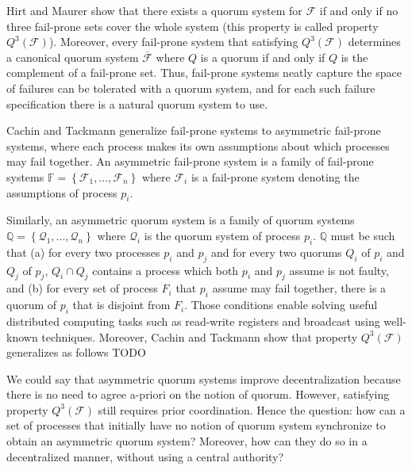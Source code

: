 \documentclass[11pt]{article}
\begin{document}
Hirt and Maurer show that there exists a quorum system for $\mathcal{F}$ if and only if no three fail-prone sets cover the whole system (this property is called property $Q^3(\mathcal{F})$). Moreover, every fail-prone system that satisfying $Q^3(\mathcal{F})$ determines a canonical quorum system $\overline{\mathcal{F}}$ where $Q$ is a quorum if and only if $Q$ is the complement of a fail-prone set. Thus, fail-prone systems neatly capture the space of failures can be tolerated with a quorum system, and for each such failure specification there is a natural quorum system to use.%

Cachin and Tackmann generalize fail-prone systems to asymmetric fail-prone systems, where each process makes its own assumptions about which processes may fail together. An asymmetric fail-prone system is a family of fail-prone systems $\mathbb{F}=\left\{\mathcal{F}_1,...,\mathcal{F}_n\right\}$ where $\mathcal{F}_i$ is a fail-prone system denoting the assumptions of process $p_i$.

Similarly, an asymmetric quorum system is a family of quorum systems $\mathbb{Q}=\left\{\mathcal{Q}_1,...,\mathcal{Q}_n\right\}$ where $\mathcal{Q}_i$ is the quorum system of process $p_i$. $\mathbb{Q}$ must be such that (a) for every two processes $p_i$ and $p_j$ and for every two quorums $Q_i$ of $p_i$ and $Q_j$ of $p_j$, $Q_i\cap Q_j$ contains a process which both $p_i$ and $p_j$ assume is not faulty, and (b) for every set of process $F_i$ that $p_i$ assume may fail together, there is a quorum of $p_i$ that is disjoint from $F_i$. Those conditions enable solving useful distributed computing tasks such as read-write registers and broadcast using well-known techniques. Moreover, Cachin and Tackmann show that property $Q^3(\mathcal{F})$ generalizes as follows TODO

We could say that asymmetric quorum systems improve decentralization because there is no need to agree a-priori on the notion of quorum. However, satisfying property $Q^3(\mathcal{F})$ still requires prior coordination. Hence the question: how can a set of processes that initially have no notion of quorum system synchronize to obtain an asymmetric quorum system? Moreover, how can they do so in a decentralized manner, without using a central authority?
\end{document}
